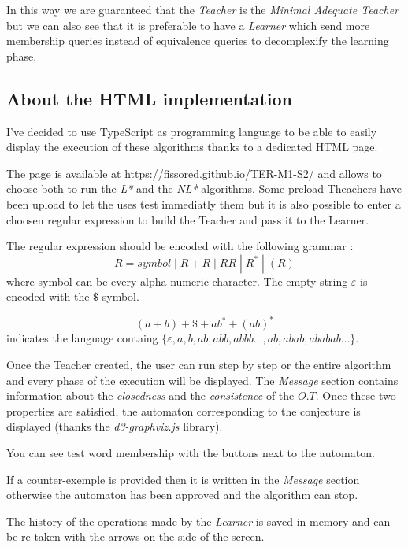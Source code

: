 In this way we are guaranteed that the \textit{Teacher} is the \textit{Minimal Adequate Teacher} but we can also see that it is preferable to have a \textit{Learner} which send more membership queries instead of equivalence queries to decomplexify the learning phase.

\subsection{About the HTML implementation}

I've decided to use TypeScript as programming language to be able to easily display the execution of these algorithms thanks to a dedicated HTML page.

The page is available at \url{https://fissored.github.io/TER-M1-S2/} and allows to choose both to run the \textit{L*} and the \textit{NL*} algorithms. Some preload Theachers have been upload to let the uses test immediatly them but it is also possible to enter a choosen regular expression to build the Teacher and pass it to the Learner.

The regular expression should be encoded with the following grammar :
\[ R = symbol \; | \; R + R \; | \; RR \; | \;R^* \; | \;(R) \]
where symbol can be every alpha-numeric character. The empty string $\varepsilon$ is encoded with the $\$$ symbol.

\begin{example}
  \[(a + b)+\$+ab^*+(ab)^*\] indicates the language containg $\{\varepsilon,a, b,  ab, abb, abbb\dots, ab, abab, ababab\dots\}$.
\end{example}

Once the Teacher created, the user can run step by step or the entire algorithm and every phase of the execution will be displayed. The \textit{Message} section contains information about the \textit{closedness} and the \textit{consistence} of the $O.T$. Once these two properties are satisfied, the automaton corresponding to the conjecture is displayed (thanks the \textit{d3-graphviz.js} library).

You can see test word membership with the buttons next to the automaton.

If a counter-exemple is provided then it is written in the \textit{Message} section otherwise the automaton has been approved and the algorithm can stop.

The history of the operations made by the \textit{Learner} is saved in memory and can be re-taken with the arrows on the side of the screen.

